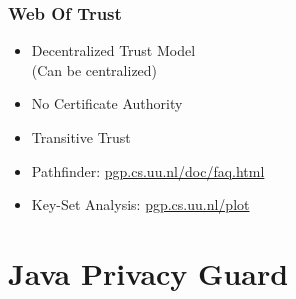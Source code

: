 \documentclass{beamer}
\begin{document}



\begin{frame}


	\frametitle{Web Of Trust}

	\begin{itemize}
		\item Decentralized Trust Model \\ (Can be centralized)
		\item No Certificate Authority
		\item Transitive Trust
	\end{itemize}	
	
	\begin{itemize}
		\item Pathfinder:          \url{pgp.cs.uu.nl/doc/faq.html}
		\item Key-Set Analysis: \url{pgp.cs.uu.nl/plot}
	\end{itemize}


\end{frame}

\section{Java Privacy Guard}
\end{document}

